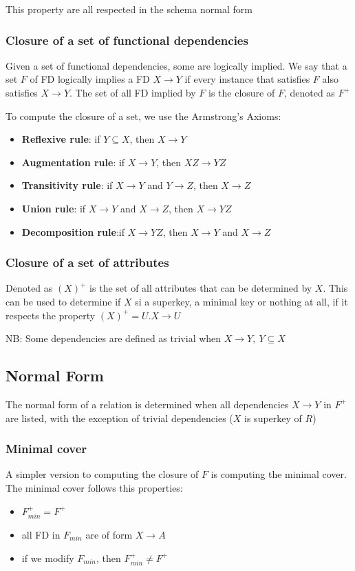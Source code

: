 \documentclass[12pt, a4paper]{article}
\begin{document}
This property are all respected in the schema normal form

\subsubsection*{Closure of a set of functional dependencies}
Given a set of functional dependencies, some are logically implied. We say that a set $F$ of FD logically implies 
a FD $X\to Y$ if every instance that satisfies $F$ also satisfies $X\to Y$. The set of all FD implied by $F$ is the
closure of $F$, denoted as $F^{+}$

To compute the closure of a set, we use the Armstrong's Axioms:
\begin{itemize}
    \item \textbf{Reflexive rule}: if $Y\subseteq X$, then $X\to Y$
    \item \textbf{Augmentation rule}: if $X\to Y$, then $XZ\to YZ$
    \item \textbf{Transitivity rule}: if $X\to Y$ and $Y\to Z$, then $X\to Z$
    \item \textbf{Union rule}: if $X\to Y$ and $X\to Z$, then $X\to YZ$
    \item \textbf{Decomposition rule}:if $X\to YZ$, then $X\to Y$ and $X\to Z$
\end{itemize}

\subsubsection*{Closure of a set of attributes}
Denoted as $(X)^{+}$ is the set of all attributes that can be determined by $X$. This can be used to determine
if $X$ si a superkey, a minimal key or nothing at all, if it respects the property $(X)^{+}=U.X \to U$

NB: Some dependencies are defined as trivial when $X\to Y,\ Y\subseteq X$

\subsection{Normal Form}
The normal form of a relation is determined when all dependencies $X\to Y$ in $F^{+}$ are listed, with the exception
of trivial dependencies ($X$ is superkey of $R$)

\subsubsection*{Minimal cover}
A simpler version to computing the closure of $F$ is computing the minimal cover. The minimal cover follows this
properties: 
\begin{itemize}
    \item $F^{+}_{min}=F^{+}$
    \item all FD in $F_{min}$ are of form $X\to A$
    \item if we modify $F_{min}$, then $F^{+}_{min}\neq F^{+}$
\end{itemize}
\end{document}
